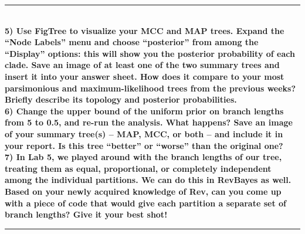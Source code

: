 \documentclass[12pt]{article}
\begin{document}
\hrule
\ \\[1ex]
\textbf{5) Use FigTree to visualize your MCC and MAP trees. Expand the ``Node Labels'' menu and choose ``posterior'' from among the ``Display'' options: this will show you the posterior probability of each clade. Save an image of at least one of the two summary trees and insert it into your answer sheet. How does it compare to your most parsimonious and maximum-likelihood trees from the previous weeks? Briefly describe its topology and posterior probabilities.} \\

\noindent \textbf{6) Change the upper bound of the uniform prior on branch lengths from 5 to 0.5, and re-run the analysis. What happens? Save an image of your summary tree(s) -- MAP, MCC, or both -- and include it in your report. Is this tree ``better'' or ``worse'' than the original one?} \\

\noindent \textbf{7) In Lab 5, we played around with the branch lengths of our tree, treating them as equal, proportional, or completely independent among the individual partitions. We can do this in RevBayes as well. Based on your newly acquired knowledge of Rev, can you come up with a piece of code that would give each partition a separate set of branch lengths? Give it your best shot!} \\
\hrule
\end{document}
